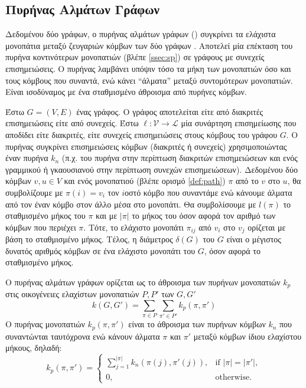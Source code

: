 \subsection{Πυρήνας Αλμάτων Γράφων}
\label{ssec:gh}
Δεδομένου δύο γράφων, ο πυρήνας αλμάτων γράφων () συγκρίνει τα ελάχιστα μονοπάτια μεταξύ ζευγαριών κόμβων των δύο γράφων \cite{feragen2013scalable}.
Αποτελεί μία επέκταση του πυρήνα κοντινότερων μονοπατιών (βλέπε \ref{ssec:sp}) σε γράφους με συνεχείς επισημειώσεις.
Ο πυρήνας λαμβάνει υπόψιν τόσο τα μήκη των μονοπατιών όσο και τους κόμβους που συναντά, ενώ κάνει ``άλματα'' μεταξύ συντομότερων μονοπατιών.
Είναι ισοδύναμος με ένα σταθμισμένο άθροισμα από πυρήνες κόμβων.\par
Έστω $G=(V,E)$ ένας γράφος.
Ο γράφος αποτελείται είτε από διακριτές επισημειώσεις είτε από συνεχείς.
Έστω $\ell : \mathcal{V} \rightarrow \mathcal{L}$ μία συνάρτηση επισημείωσης που αποδίδει είτε διακριτές, είτε συνεχείς επισημειώσεις στους κόμβους του γράφου $G$.
Ο πυρήνας συγκρίνει επισημειώσεις κόμβων (διακριτές ή συνεχείς) χρησιμοποιώντας έναν πυρήνα $k_n$ (π.χ. του πυρήνα  στην περίπτωση διακριτών επισημειώσεων και ενός γραμμικού ή γκαουσιανού στην περίπτωση συνεχών επισημειώσεων).
Δεδομένου δύο κόμβων $v,u \in V$ και ενός μονοπατιού (βλέπε ορισμό \ref{def:path}) $\pi$ από το $v$ στο $u$, θα συμβολίζουμε με $\pi(i) = v_i$ τον $i$οστό κόμβο που συναντάμε ενώ κάνουμε άλματα από τον έναν κόμβο στον άλλο μέσα στο μονοπάτι.
Θα συμβολίσουμε με $l(\pi)$ το σταθμισμένο μήκος του $\pi$ και με $|\pi|$ το μήκος του όσον αφορά τον αριθμό των κόμβων που περιέχει $\pi$.
Τότε, το ελάχιστο μονοπάτι $\pi_{ij}$ από $v_i$ στο $v_j$ ορίζεται με βάση το σταθμισμένο μήκος.
Τέλος, η διάμετρος $\delta(G)$ του $G$ είναι ο μέγιστος δυνατός αριθμός κόμβων σε ένα ελάχιστο μονοπάτι του $G$, όσον αφορά το σταθμισμένο μήκος.\par
Ο πυρήνας αλμάτων γράφων ορίζεται ως το άθροισμα των πυρήνων μονοπατιών $k_p$ στις οικογένειες ελαχίστων μονοπατιών $P, P'$ των $G,G'$
\begin{equation}
    k(G,G') = \sum_{\pi \in P} \sum_{\pi' \in P'} k_p(\pi, \pi')
\end{equation}
Ο πυρήνας μονοπατιών $k_p(\pi, \pi')$ είναι το άθροισμα των πυρήνων κόμβων $k_n$ που συναντώνται ταυτόχρονα ενώ κάνουν άλματα $\pi$ και $\pi'$ μεταξύ κόμβων ίδιου ελαχίστου μήκους, δηλαδή:
\begin{equation}
    k_p(\pi, \pi') = \begin{cases}
        \sum_{j=1}^{|\pi|} k_n(\pi(j), \pi'(j)), & \text{if $|\pi| = |\pi'|$},\\
        0, & \text{otherwise.} 
        \end{cases}
\end{equation}
